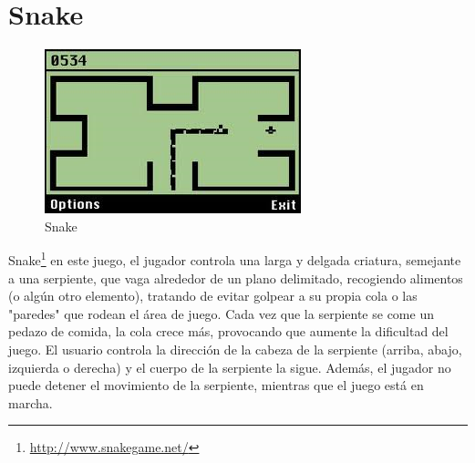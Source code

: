 \section{Snake}

\begin{figure}[htbp]
\begin{center}
\includegraphics[width=.60\textwidth]{./imagenes/snake.png}
\caption{Snake}
\label{Snake}
\end{center}
\end{figure}
Snake\footnote{\url{http://www.snakegame.net/}} en este juego, el jugador controla una larga y delgada criatura, semejante a una serpiente, que vaga alrededor de un plano delimitado, recogiendo alimentos (o algún otro elemento), tratando de evitar golpear a su propia cola o las "paredes" que rodean el área de juego. Cada vez que la serpiente se come un pedazo de comida, la cola crece más, provocando que aumente la dificultad del juego. El usuario controla la dirección de la cabeza de la serpiente (arriba, abajo, izquierda o derecha) y el cuerpo de la serpiente la sigue. Además, el jugador no puede detener el movimiento de la serpiente, mientras que el juego está en marcha.

\vfill

